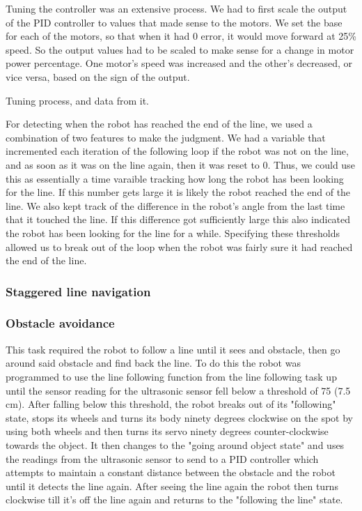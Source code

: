 \documentclass[12pt]{article}
\begin{document}
Tuning the controller was an extensive process. We had to first scale the output of the PID controller to values that made sense to the motors. We set the base  for each of the motors, so that when it had 0 error, it would move forward at 25\% speed.  So the output values had to be scaled to make sense for a change in motor power percentage. One motor's speed was increased and the other's decreased, or vice versa, based on the sign of the output.

Tuning process, and data from it.

For detecting when the robot has reached the end of the line, we used a combination of two features to make the judgment. We had a variable that incremented each iteration of the following loop if the robot was not on the line, and as soon as it was on the line again, then it was reset to 0. Thus, we could use this as essentially a time varaible tracking how long the robot has been looking for the line. If this number gets large it is likely the robot reached the end of the line. We also kept track of the difference in the robot's angle from the last time that it touched the line. If this difference got sufficiently large this also indicated the robot has been looking for the line for a while. Specifying these thresholds allowed us to break out of the loop when the robot was fairly sure it had reached the end of the line.

\subsubsection{Staggered line navigation}

\subsubsection{Obstacle avoidance}
This task required the robot to follow a line until it sees and obstacle, then go around said obstacle and find back the line. To do this the robot was programmed to use the line following function from the line following task up until the sensor reading for the ultrasonic sensor fell below a threshold of 75 (7.5 cm). After falling below this threshold, the robot breaks out of its "following" state, stops its wheels and turns its body ninety degrees clockwise on the spot by using both wheels and then turns its servo ninety degrees counter-clockwise towards the object. It then changes to the "going around object state" and uses the readings from the ultrasonic sensor to send to a PID controller which attempts to maintain a constant distance between the obstacle and the robot until it detects the line again. After seeing the line again the robot then turns clockwise till it's off the line again and returns to the "following the line" state. 
\end{document}
